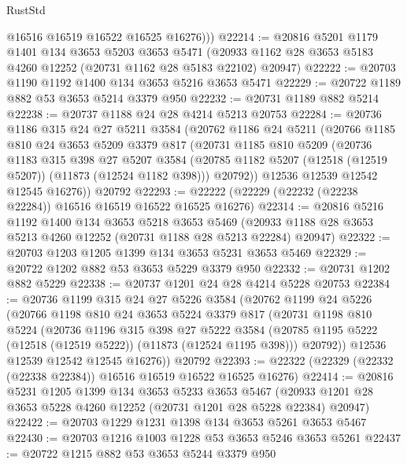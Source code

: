 \begin{lexlean}{RustStd}
\begin{coremodule}
          @16516
          @16519
          @16522
          @16525
          @16276)))
@22214 := @20816
    @5201
    @1179
    @1401
    @134
    @3653
    @5203
    @3653
    @5471
    (@20933 @1162 @28 @3653 @5183 @4260 @12252 (@20731 @1162 @28 @5183 @22102) @20947)
@22222 := @20703 @1190 @1192 @1400 @134 @3653 @5216 @3653 @5471
@22229 := @20722 @1189 @882 @53 @3653 @5214 @3379 @950
@22232 := @20731 @1189 @882 @5214
@22238 := @20737 @1188 @24 @28 @4214 @5213 @20753
@22284 := @20736
    @1186
    @315
    @24
    @27
    @5211
    @3584
    (@20762
      @1186
      @24
      @5211
      (@20766
        @1185
        @810
        @24
        @3653
        @5209
        @3379
        @817
        (@20731
          @1185
          @810
          @5209
          (@20736
            @1183
            @315
            @398
            @27
            @5207
            @3584
            (@20785 @1182 @5207 (@12518 (@12519 @5207)) (@11873 (@12524 @1182 @398)))
            @20792))
        @12536
        @12539
        @12542
        @12545
        @16276))
    @20792
@22293 := @22222 (@22229 (@22232 (@22238 @22284)) @16516 @16519 @16522 @16525 @16276)
@22314 := @20816
    @5216
    @1192
    @1400
    @134
    @3653
    @5218
    @3653
    @5469
    (@20933 @1188 @28 @3653 @5213 @4260 @12252 (@20731 @1188 @28 @5213 @22284) @20947)
@22322 := @20703 @1203 @1205 @1399 @134 @3653 @5231 @3653 @5469
@22329 := @20722 @1202 @882 @53 @3653 @5229 @3379 @950
@22332 := @20731 @1202 @882 @5229
@22338 := @20737 @1201 @24 @28 @4214 @5228 @20753
@22384 := @20736
    @1199
    @315
    @24
    @27
    @5226
    @3584
    (@20762
      @1199
      @24
      @5226
      (@20766
        @1198
        @810
        @24
        @3653
        @5224
        @3379
        @817
        (@20731
          @1198
          @810
          @5224
          (@20736
            @1196
            @315
            @398
            @27
            @5222
            @3584
            (@20785 @1195 @5222 (@12518 (@12519 @5222)) (@11873 (@12524 @1195 @398)))
            @20792))
        @12536
        @12539
        @12542
        @12545
        @16276))
    @20792
@22393 := @22322 (@22329 (@22332 (@22338 @22384)) @16516 @16519 @16522 @16525 @16276)
@22414 := @20816
    @5231
    @1205
    @1399
    @134
    @3653
    @5233
    @3653
    @5467
    (@20933 @1201 @28 @3653 @5228 @4260 @12252 (@20731 @1201 @28 @5228 @22384) @20947)
@22422 := @20703 @1229 @1231 @1398 @134 @3653 @5261 @3653 @5467
@22430 := @20703 @1216 @1003 @1228 @53 @3653 @5246 @3653 @5261
@22437 := @20722 @1215 @882 @53 @3653 @5244 @3379 @950

\end{coremodule}
\end{lexlean}
